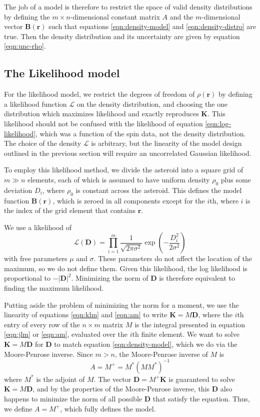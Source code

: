 \documentclass[fleqn,usenatbib]{mnras}
\newcommand{\parens}[1]{\left( #1 \right)}
\begin{document}
The job of a model is therefore to restrict the space of valid density distributions by defining the $m\times n$-dimensional constant matrix $A$ and the $m$-dimensional vector $\bm B(\bm r)$ such that equations \ref{eqn:density-model} and \ref{eqn:density-distro} are true. Then the density distribution and its uncertainty are given by equation \ref{eqn:unc-rho}.



\subsection{The Likelihood model}
For the likelihood model, we restrict the degrees of freedom of $\rho(\bm r)$ by defining a likelihood function $\mathcal{L}$ on the density distribution, and choosing the one distribution which maximizes likelihood and exactly reproduces $\bm K$. This likelihood should not be confused with the likelihood of equation \ref{eqn:log-likelihood}, which was a function of the spin data, not the density distribution. The choice of the density $\mathcal{L}$ is arbitrary, but the linearity of the model design outlined in the previous section will require an uncorrelated Gaussian likelihood.

To employ this likelihood method, we divide the asteroid into a square grid of $m \gg n$ elements, each of which is assumed to have uniform density $\rho_0$ plus some deviation $D_i$, where $\rho_0$ is constant across the asteroid. This defines the model function $\bm B(\bm r)$, which is zeroed in all components except for the $i$th, where $i$ is the index of the grid element that contains $\bm r$.

We use a likelihood of 
\begin{equation}
  \mathcal{L}(\bm D) = \prod_{i=1}^m \frac{1}{\sqrt{2\pi \sigma^2}} \exp\parens{-\frac{D_i^2}{2 \sigma^2}}
\end{equation}
with free parameters $\mu$ and $\sigma$. These parameters do not affect the location of the maximum, so we do not define them. Given this likelihood, the log likelihood is proportional to $-|\bm D|^2$. Minimizing the norm of $\bm D$ is therefore equivalent to finding the maximum likelihood.

Putting aside the problem of minimizing the norm for a moment, we use the linearity of equations \ref{eqn:klm} and \ref{eqn:am} to write $\bm K = M \bm D$, where the $i$th entry of every row of the $n\times m$ matrix $M$ is the integral presented in equation \ref{eqn:jlm} or \ref{eqn:am}, evaluated over the $i$th finite element. We want to solve $\bm K = M \bm D$ for $\bm D$ to match equation \ref{eqn:density-model}, which we do via the Moore-Penrose inverse. Since $m>n$, the Moore-Penrose inverse of $M$ is
\begin{equation}
  A=M^+ = M^*(MM^*)^{-1}
  \label{eqn:mpi-underdetermined}
\end{equation}
where $M^*$ is the adjoint of $M$. The vector $\bm D=M^+\bm K$ is guaranteed to solve $\bm K = M \bm D$, and by the properties of the Moore-Penrose inverse, this $\bm D$ also happens to minimize the norm of all possible $\bm D$ that satisfy the equation. Thus, we define $A=M^+$, which fully defines the model.
\end{document}
